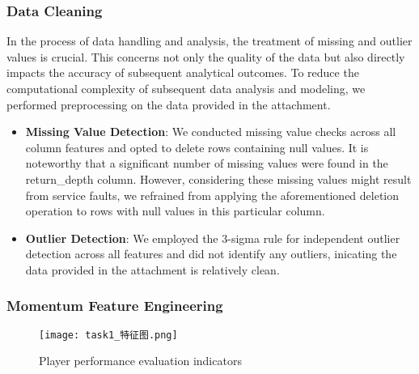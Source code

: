 \documentclass{mcmthesis}
\begin{document}
\subsubsection{Data Cleaning}
\qquad In the process of data handling and analysis, the treatment of missing and outlier values is crucial. This concerns not only the quality of the data but also directly impacts the accuracy of subsequent analytical outcomes. To reduce the computational complexity of subsequent data analysis and modeling, we performed preprocessing on the data provided in the attachment.
\begin{itemize}
    \item \textbf{Missing Value Detection}: We conducted missing value checks across all column features and opted to delete rows containing null values.
          It is noteworthy that a significant number of missing values were found in the return\_depth column. However, considering these missing values might result from service faults, we refrained from applying the aforementioned deletion operation to rows with null values in this particular column.
    \item {\bf Outlier Detection}: We employed the 3-sigma rule for independent outlier detection across all features and did not identify any outliers, inicating the data provided in the attachment is relatively clean.
\end{itemize}

\subsubsection{Momentum Feature Engineering}
\begin{figure}[h]
    \centering
    \texttt{[image: task1\_特征图.png]}
    \caption{Player performance evaluation indicators} \label{fig_img2}
\end{figure}
\end{document}
